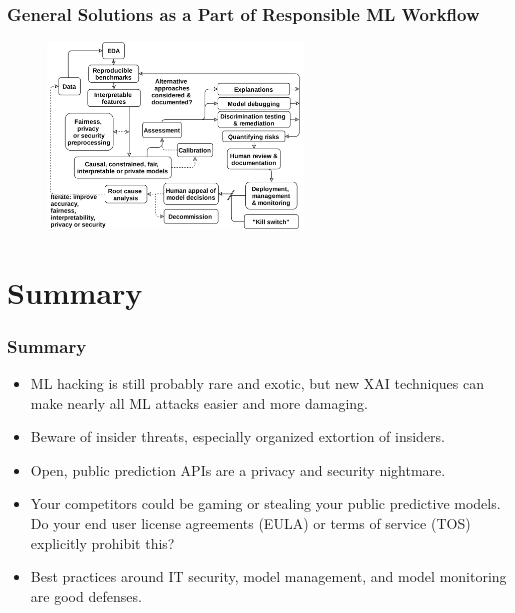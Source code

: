 \documentclass[11pt,
               aspectratio=169,
               hyperref={colorlinks}
               ]{beamer}
\begin{document}
		\begin{frame}
		
			\frametitle{General Solutions as a Part of Responsible ML Workflow}		
			
			\begin{figure}[htb]
				\begin{center}
					\includegraphics[height=140pt]{../img/rml_diagram_no_hilite.png}
				\end{center}
			\end{figure}	

		\end{frame}

	\section{Summary}

		\begin{frame}
		
			\frametitle{Summary}		
			
			\begin{itemize}
				\item ML hacking is still probably rare and exotic, but new XAI techniques can make nearly all ML attacks easier and more damaging.
				\item Beware of insider threats, especially organized extortion of insiders. 
				\item Open, public prediction APIs are a privacy and security nightmare. 
				\item Your competitors could be gaming or stealing your public predictive models. Do your end user license agreements (EULA) or terms of service (TOS) explicitly prohibit this?
				\item Best practices around IT security, model management, and model monitoring are good defenses.
			\end{itemize}
		
		\end{frame}
\end{document}
